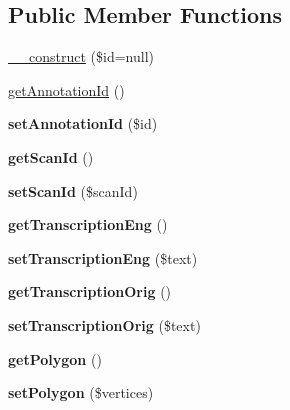 \subsection*{Public Member Functions}
\begin{DoxyCompactItemize}
\item 
\hyperlink{classAnnotation_af57b6e7052a1fecfeb356cdff41c496d}{\_\-\_\-construct} (\$id=null)
\item 
\hyperlink{classAnnotation_adbcbb98bb486349e29dbf508e4c20b41}{getAnnotationId} ()
\item 
\hypertarget{classAnnotation_a52e746610b2ddfbff35069c3c25a7e74}{
{\bfseries setAnnotationId} (\$id)}
\label{classAnnotation_a52e746610b2ddfbff35069c3c25a7e74}

\item 
\hypertarget{classAnnotation_a39a9dfd9540b0c9b592234a8944340e8}{
{\bfseries getScanId} ()}
\label{classAnnotation_a39a9dfd9540b0c9b592234a8944340e8}

\item 
\hypertarget{classAnnotation_aeb26b23e7ab877fc6753d6fd0d6515e3}{
{\bfseries setScanId} (\$scanId)}
\label{classAnnotation_aeb26b23e7ab877fc6753d6fd0d6515e3}

\item 
\hypertarget{classAnnotation_a4b08791642a18949c11f862ca36e3597}{
{\bfseries getTranscriptionEng} ()}
\label{classAnnotation_a4b08791642a18949c11f862ca36e3597}

\item 
\hypertarget{classAnnotation_acf6d1331967826e89af78b28d0c4a328}{
{\bfseries setTranscriptionEng} (\$text)}
\label{classAnnotation_acf6d1331967826e89af78b28d0c4a328}

\item 
\hypertarget{classAnnotation_af918e0cf667e0b4120cbc39bb5cf5166}{
{\bfseries getTranscriptionOrig} ()}
\label{classAnnotation_af918e0cf667e0b4120cbc39bb5cf5166}

\item 
\hypertarget{classAnnotation_a8f3fc5ffc8815676b0bd786eb3215adc}{
{\bfseries setTranscriptionOrig} (\$text)}
\label{classAnnotation_a8f3fc5ffc8815676b0bd786eb3215adc}

\item 
\hypertarget{classAnnotation_a0feb60dcbea827dac720bf0b26384bc0}{
{\bfseries getPolygon} ()}
\label{classAnnotation_a0feb60dcbea827dac720bf0b26384bc0}

\item 
\hypertarget{classAnnotation_a6ba5dabd95e280731011e3846a4e0c7c}{
{\bfseries setPolygon} (\$vertices)}
\label{classAnnotation_a6ba5dabd95e280731011e3846a4e0c7c}


\end{DoxyCompactItemize}
